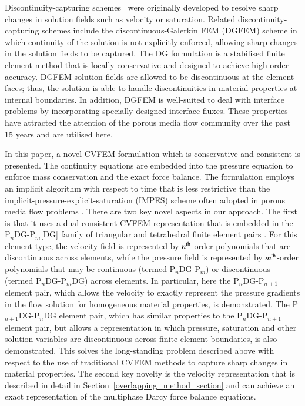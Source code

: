 \documentclass[preprint,authoryear,12pt]{elsarticle}
\newcommand{\PN}[2][error]{P$_{#1}$DG-P$_{#2}$}
\newcommand{\PNDG}[2][error]{P$_{#1}$DG-P$_{#2}$DG}
\begin{document}
Discontinuity-capturing schemes~\citep[e.g. shock waves, contact
  surface or material discontinuities --
  see][]{brooks_1982,tezduyar_1986} were originally developed to
resolve sharp changes in solution fields such as velocity or
saturation. Related discontinuity-capturing schemes include the
discontinuous-Galerkin FEM (DGFEM) scheme in which continuity of the
solution is not explicitly enforced, allowing sharp changes in the
solution fields to be captured. The DG formulation is a stabilised
finite element method that is locally conservative and designed to
achieve high-order accuracy. DGFEM solution fields are allowed to be
discontinuous at the element faces; thus, the solution is able to
handle discontinuities in material properties at internal
boundaries. In addition, DGFEM is well-suited to deal with interface
problems by incorporating specially-designed interface fluxes. These
properties have attracted the attention of the porous media flow
community over the past 15 years
\citep[see][]{riviere_2000,riviere_2002,bastian_2002} and are utilised
here.

In this paper, a novel CVFEM formulation which is conservative and
consistent is presented. The continuity equations are embedded into
the pressure equation to enforce mass conservation and the exact force
balance. The formulation employs an implicit algorithm with respect to
time that is less restrictive than the
implicit-pressure-explicit-saturation (IMPES) scheme often adopted in
porous media flow problems \citep[e.g. see][]{aziz_1986,
  geiger_2004}. There are two key novel aspects in our approach. The
first is that it uses a dual consistent CVFEM representation that is
embedded in the \PN[n]{m}[DG] family of triangular and tetrahedral
finite element pairs \citep[see][]{kaisu}. For this element type, the
velocity field is represented by $n^{\rm th}$-order polynomials that
are discontinuous across elements, while the pressure field is
represented by $m^{\rm th}$-order polynomials that may be continuous
(termed P$_n$DG-P$_m$) or discontinuous (termed P$_n$DG-P$_m$DG)
across elements. In particular, here the P$_n$DG-P$_{n+1}$ element
pair, which allows the velocity to exactly represent the pressure
gradients in the flow solution for homogeneous material properties, is
demonstrated. The \PNDG[n+1]{n} element pair, which has similar
properties to the \PN[n]{n+1} element pair, but allows a
representation in which pressure, saturation and other solution
variables are discontinuous across finite element boundaries, is also
demonstrated.  This solves the long-standing problem described above
with respect to the use of traditional CVFEM methods to capture sharp
changes in material properties. The second key novelty is the velocity
representation that is described in detail in
Section~\ref{overlapping_method_section} and can achieve an exact
representation of the multiphase Darcy force balance equations.
\end{document}
